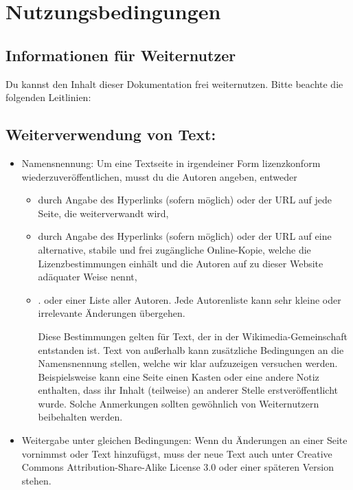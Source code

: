 \documentclass[10pt,a4paper]{article}
\begin{document}
\section{Nutzungsbedingungen}

\subsection{Informationen für Weiternutzer}

Du kannst den Inhalt dieser Dokumentation frei weiternutzen. Bitte beachte die
folgenden Leitlinien:

\subsection{Weiterverwendung von Text:}

\begin{itemize}

 \item Namensnennung: Um eine Textseite in irgendeiner Form lizenzkonform
 wiederzuveröffentlichen, musst du die Autoren angeben, entweder
 \begin{itemize}


  \item durch Angabe des Hyperlinks (sofern möglich) oder der URL auf jede
  Seite, die weiterverwandt wird,
  \item durch Angabe des Hyperlinks (sofern möglich) oder der URL auf eine
  alternative, stabile und frei zugängliche Online-Kopie, welche die
  Lizenzbestimmungen einhält und die Autoren auf zu dieser Website adäquater
  Weise nennt,
  \item. oder einer Liste aller Autoren. Jede Autorenliste kann sehr kleine
  oder irrelevante Änderungen übergehen.

  Diese Bestimmungen gelten für Text, der in der Wikimedia-Gemeinschaft
  entstanden ist. Text von außerhalb kann zusätzliche Bedingungen an die
  Namensnennung stellen, welche wir klar aufzuzeigen versuchen werden.
  Beispielsweise kann eine Seite einen Kasten oder eine andere Notiz enthalten,
  dass ihr Inhalt (teilweise) an anderer Stelle erstveröffentlicht wurde.
  Solche Anmerkungen sollten gewöhnlich von Weiternutzern beibehalten werden.

 \end{itemize}
 \item Weitergabe unter gleichen Bedingungen: Wenn du Änderungen an einer Seite
 vornimmst oder Text hinzufügst, muss der neue Text auch unter Creative Commons
 Attribution-Share-Alike License 3.0 oder einer späteren Version stehen.


\end{itemize}
\end{document}
